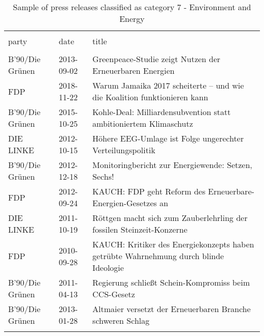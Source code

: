 
\begin{table}[!htbp] \centering 
  \caption{Sample of press releases classified as category 7 - Environment and Energy} 
  \label{tab:7-document-samples} 
\begin{tabularx}{\textwidth}{stX} 
\\[-1.8ex]\hline 
\hline \\[-1.8ex] 
party & date & title \\ 
\hline \\[-1.8ex] 
B'90/Die Grünen & 2013-09-02 & Greenpeace-Studie zeigt Nutzen der Erneuerbaren Energien \\ 
FDP & 2018-11-22 & Warum Jamaika 2017 scheiterte – und wie die Koalition funktionieren kann \\ 
B'90/Die Grünen & 2015-10-25 & Kohle-Deal: Milliardensubvention statt ambitioniertem Klimaschutz \\ 
DIE LINKE & 2012-10-15 & Höhere EEG-Umlage ist Folge ungerechter Verteilungspolitik \\ 
B'90/Die Grünen & 2012-12-18 & Monitoringbericht zur Energiewende: Setzen, Sechs! \\ 
FDP & 2012-09-24 & KAUCH: FDP geht Reform des Erneuerbare-Energien-Gesetzes an \\ 
DIE LINKE & 2011-10-19 & Röttgen macht sich zum Zauberlehrling der fossilen Steinzeit-Konzerne \\ 
FDP & 2010-09-28 & KAUCH: Kritiker des Energiekonzepts haben getrübte Wahrnehmung durch blinde Ideologie \\ 
B'90/Die Grünen & 2011-04-13 & Regierung schließt Schein-Kompromiss beim CCS-Gesetz \\ 
B'90/Die Grünen & 2013-01-28 & Altmaier versetzt der Erneuerbaren Branche schweren Schlag \\ 
\hline \\[-1.8ex] 
\end{tabularx} 
\end{table} 
